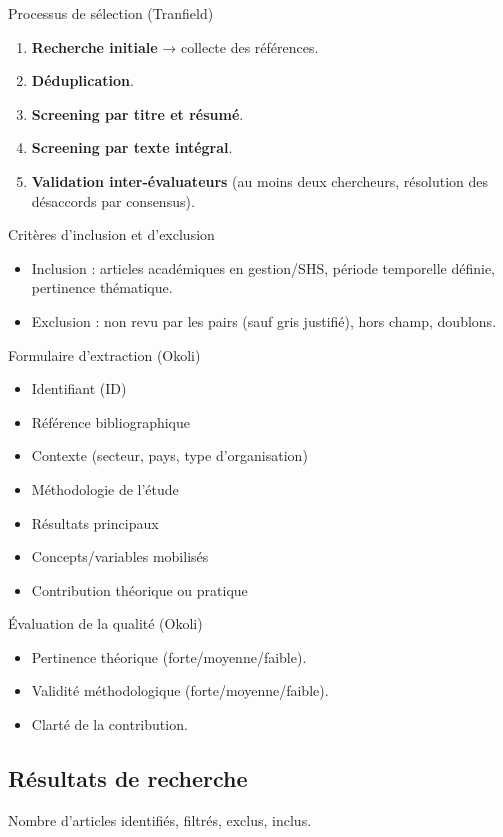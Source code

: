 \documentclass[a4paper,12pt]{article}
\begin{document}
Processus de sélection (Tranfield)
\begin{enumerate}
\item \textbf{\textbf{Recherche initiale}} → collecte des références.
\item \textbf{\textbf{Déduplication}}.
\item \textbf{\textbf{Screening par titre et résumé}}.
\item \textbf{\textbf{Screening par texte intégral}}.
\item \textbf{\textbf{Validation inter-évaluateurs}} (au moins deux chercheurs, résolution des désaccords par consensus).
\end{enumerate}

Critères d’inclusion et d'exclusion
\begin{itemize}
\item Inclusion : articles académiques en gestion/SHS, période temporelle définie, pertinence thématique.
\item Exclusion : non revu par les pairs (sauf gris justifié), hors champ, doublons.
\end{itemize}

Formulaire d’extraction (Okoli)
\begin{itemize}
\item Identifiant (ID)
\item Référence bibliographique
\item Contexte (secteur, pays, type d’organisation)
\item Méthodologie de l’étude
\item Résultats principaux
\item Concepts/variables mobilisés
\item Contribution théorique ou pratique
\end{itemize}

Évaluation de la qualité (Okoli)
\begin{itemize}
\item Pertinence théorique (forte/moyenne/faible).
\item Validité méthodologique (forte/moyenne/faible).
\item Clarté de la contribution.
\end{itemize}
\subsection{Résultats de recherche}
\label{sec:org882d1a1}
Nombre d’articles identifiés, filtrés, exclus, inclus.
\end{document}
